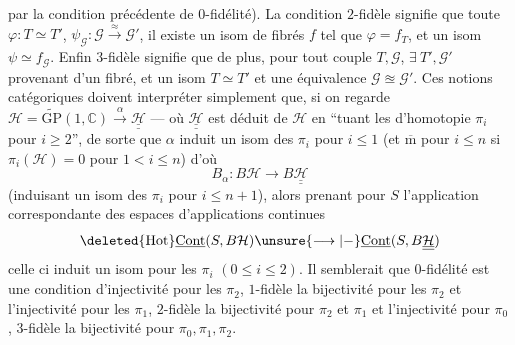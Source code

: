 par la condition précédente de $0$-fidélité). La
condition $2$-fidèle signifie que  toute
 $\varphi:T\simeq T'$,
$\psi_{\mathcal G}:\mathcal G\xrightarrow{\approx}\mathcal G'$,
il existe
un isom de fibrés $f$ tel que $\varphi=f_T$,
et un isom $\psi\simeq f_{\mathcal G}$. Enfin $3$-fidèle signifie
que de plus, pour tout couple $T,\mathcal G$,
$\exists\ T',\mathcal G'$ provenant d'un fibré, 
et un isom $T\simeq T'$ et une équivalence
$\mathcal G\approxeq\mathcal G'$. Ces notions catégoriques
doivent interpréter simplement que, si
on regarde $\mathcal H=\widetilde{\mathrm{GP}}(1,\mathbb C)
\xrightarrow{\alpha}\underline{\underline{\mathcal H}}$
--- où $\underline{\underline{\mathcal H}}$
est déduit de $\mathcal H$ en ``tuant les 
d'homotopie $\pi_i$ pour $i\geq2$'', de sorte que
$\alpha$ induit un isom des $\pi_i$ pour $i\leq1$
(et $\overline{\mathrm m}$ pour $i\leq n$ si
$\pi_i(\mathcal H)=0$ pour $1<i\leq n$)
 d'où
\[
B_\alpha:B\mathcal H\longrightarrow B\underline{\underline{\mathcal H}}
\]
(induisant un isom des $\pi_i$ pour $i\leq n+1$),
alors prenant pour   $S$ l'application
correspondante des espaces d'applications continues
\[
\deleted{\mathrm{Hot}}
\underline{\mathrm{Cont}}(S,B\mathcal H)
\unsure{\longrightarrow|{-}}
\underline{\mathrm{Cont}}(S,B\underline{\underline{\mathcal H}})
\]
celle ci induit un isom pour les
$\pi_i$ $(0\leq i\leq2)$.  Il semblerait que
$0$-fidélité est une condition d'injectivité
pour les $\pi_2$, $1$-fidèle la bijectivité pour les
$\pi_2$ et l'injectivité pour les $\pi_1$, $2$-fidèle
la bijectivité pour $\pi_2$ et $\pi_1$ et l'injectivité
pour $\pi_0$, $3$-fidèle la bijectivité pour $\pi_0,\pi_1,\pi_2$.


